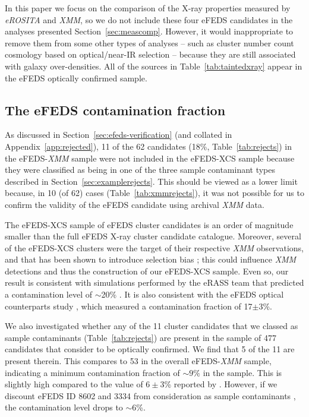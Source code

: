 \documentclass[fleqn,usenatbib]{mnras}
\begin{document}
In this paper we focus on the comparison of the X-ray properties measured by {\em eROSITA} and {\em XMM}, so we do not include these four eFEDS candidates in the analyses presented Section~\ref{sec:meascomp}.
However, it would inappropriate to remove them from some other types of analyses -- such as cluster number count cosmology based on optical/near-IR selection  \cite{efedsclusteropticalcat} -- because they are still associated with galaxy over-densities. All of the sources in Table~\ref{tab:taintedxray} appear in the eFEDS optically confirmed sample.

\subsection{The eFEDS contamination fraction}
\label{sec:contamfrac}

As discussed in Section~\ref{sec:efeds-verification} (and collated in Appendix~\ref{app:rejected}), 11 of the 62 candidates (18\%, Table~\ref{tab:rejects}) in the eFEDS-{\em XMM} sample were not included in the eFEDS-XCS sample because they were classified  as being in one of the three sample contaminant types described in Section~\ref{sec:examplerejects}. This should be viewed as a lower limit because, in 10 (of 62) cases (Table~\ref{tab:xmmrejects}),  it was not possible for us to confirm the validity of the eFEDS candidate using archival {\em XMM} data. 

The eFEDS-XCS sample of eFEDS cluster candidates is an order of magnitude smaller than the full eFEDS X-ray cluster candidate catalogue.
Moreover, several of the eFEDS-XCS clusters were the target of their respective {\em XMM} observations, and that has been shown to introduce selection bias \citep[][]{xcsgiles}; this could influence {\em XMM} detections and thus the construction of our eFEDS-XCS sample. Even so, our result is consistent with simulations performed by the eRASS team that predicted a contamination level of $\sim$20\% \citep{simerass}. It is also consistent with the eFEDS optical counterparts study \citep[][]{efedsclusteropticalcat}, which measured a contamination fraction of 17$\pm 3$\%.

We also investigated whether any of the 11 cluster candidates that we classed as sample contaminants (Table~\ref{tab:rejects}) are present in the sample of 477 candidates that \cite{efedsclusteropticalcat} consider to be optically confirmed. We find that 5 of the 11 are present therein. This compares to 53 in the overall eFEDS-{\em XMM} sample, indicating a minimum contamination fraction of ${\sim}9\%$ in the \cite{efedsclusteropticalcat} sample. This is slightly high compared to the value of $6\pm 3$\% reported by \cite{efedsclusteropticalcat}. However, if we discount eFEDS ID 8602 and 3334 from consideration as sample contaminants \citep[to be more consistent with approach taken in][]{efedsclusteropticalcat}, the contamination level drops to ${\sim}$6\%. 
\end{document}
